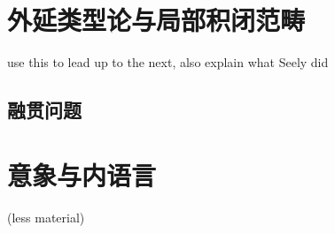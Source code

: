 \section{外延类型论与局部积闭范畴}

use this to lead up to the next, also explain what Seely did

\subsection{融贯问题}

\section{意象与内语言}

(less material)


